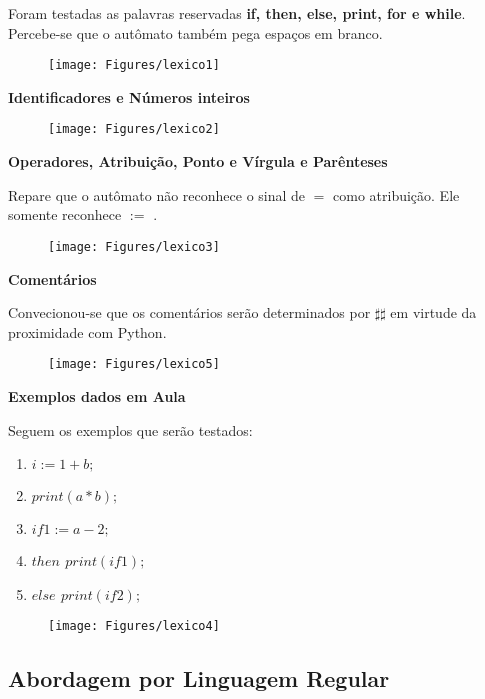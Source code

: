 \documentclass[hidelinks,12pt]{article}
\begin{document}
	Foram testadas as palavras reservadas \textbf{if, then, else, print, for e while}. Percebe-se que o autômato também pega espaços em branco.
	
	\begin{figure}[!h]
		\centering
		\texttt{[image: Figures/lexico1]}
	\end{figure}
	
	\noindent\textbf{\large Identificadores e Números inteiros}
	
	\begin{figure}[!h]
		\centering
		\texttt{[image: Figures/lexico2]}
	\end{figure}
	
	\noindent\textbf{\large Operadores, Atribuição, Ponto e Vírgula e Parênteses}
	
	Repare que o autômato não reconhece o sinal de $=$ como atribuição. Ele somente reconhece $:=$  .
	
	\begin{figure}[!h]
		\centering
		\texttt{[image: Figures/lexico3]}
	\end{figure}
	
	\noindent\textbf{\large Comentários}
	
	Convecionou-se que os comentários serão determinados por $\sharp\sharp$ em virtude da proximidade com Python.
	
	\begin{figure}[!h]
		\centering
		\texttt{[image: Figures/lexico5]}
	\end{figure}
	
	\newpage
	\noindent\textbf{\large Exemplos dados em Aula}
	
	Seguem os exemplos que serão testados:
	\begin{enumerate}
		\item \textbf{$i := 1 + b ;$}
		\item \textbf{$print(a*b);$}
		\item \textbf{$if1 := a-2;$}
		\item \textbf{$then$    $print(if1);$}
		\item \textbf{$else$  $print(if2);$}
	\end{enumerate}
	
	\begin{figure}[!h]
		\centering
		\texttt{[image: Figures/lexico4]}
	\end{figure}
	
	\subsection{Abordagem por Linguagem Regular}
	
\end{document}
